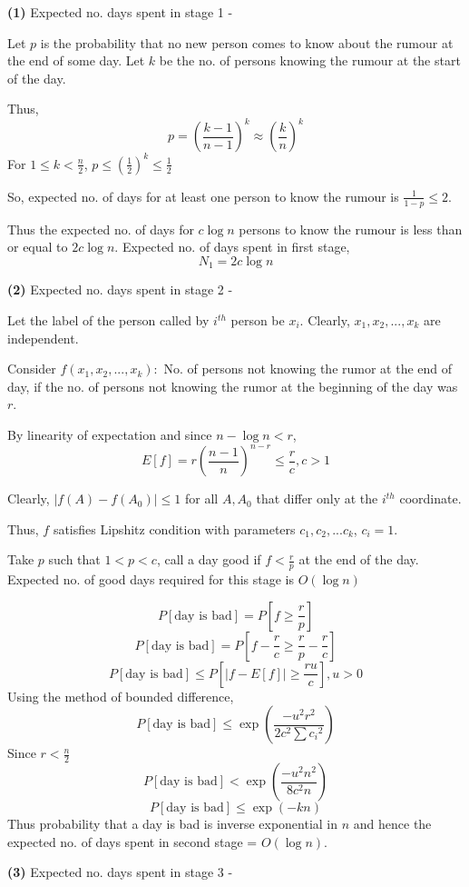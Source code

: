 \documentclass[a4paper]{article}
\begin{document}
\textbf{(1)} Expected no. days spent in stage 1 - 

Let $p$ is the probability that no new person comes to know about the rumour at the end of some day. Let $k$ be the no. of persons knowing the rumour at the start of the day.

Thus,
$$p = \left(\frac{k-1}{n-1}\right)^k \approx \left(\frac{k}{n}\right)^k$$
For $1 \leq k < \frac{n}{2}$, $p \leq \left(\frac{1}{2}\right)^k \leq \frac{1}{2}$

So, expected no. of days for at least one person to know the rumour is $\frac{1}{1 - p} \leq 2$.

Thus the expected no. of days for $c\log n$ persons to know the rumour is less than or equal to $2c\log n$.
Expected no. of days spent in first stage, $$N_1 = 2c\log n$$

\textbf{(2)} Expected no. days spent in stage 2 - 

Let the label of the person called by $i^{th}$ person be $x_i$. Clearly, $x_1,x_2,...,x_k$ are independent.

Consider $f(x_1,x_2,...,x_k) : $ No. of persons not knowing the rumor at the end of day, if the no. of persons not knowing the rumor at the beginning of the day was $r$.

By linearity of expectation and since $n - \log n < r$,
$$E[f] = r\left(\frac{n-1}{n}\right)^{n-r} \leq \frac{r}{c}, c > 1$$

Clearly, $|f(A) - f(A_0)| \leq 1$ for all $A, A_0$ that differ only at the $i^{th}$ coordinate.

Thus, $f$ satisfies Lipshitz condition with parameters $c_1,c_2,...c_k$, $c_i = 1$.

Take $p$ such that $1 < p < c$, call a day good if $f < \frac{r}{p}$ at the end of the day.
Expected no. of good days required for this stage is $O(\log n)$

$$P[\text{day is bad}] = P\left[f \geq \frac{r}{p}\right]$$
$$P[\text{day is bad}] = P\left[f - \frac{r}{c} \geq \frac{r}{p}-\frac{r}{c}\right]$$
$$P[\text{day is bad}] \leq P\left[|f - E[f]| \geq \frac{ru}{c}\right], u > 0$$
Using the method of bounded difference,
$$P[\text{day is bad}] \leq \exp\left(\frac{-u^2r^2}{2c^2\sum {c_i}^2}\right)$$
Since $r < \frac{n}{2}$
$$P[\text{day is bad}] < \exp\left(\frac{-u^2n^2}{8c^2n}\right)$$
$$P[\text{day is bad}] \leq \exp(-kn)$$
Thus probability that a day is bad is inverse exponential in $n$ and hence the expected no. of days spent in second stage = $O(\log n)$.


\textbf{(3)} Expected no. days spent in stage 3 - 
\end{document}
